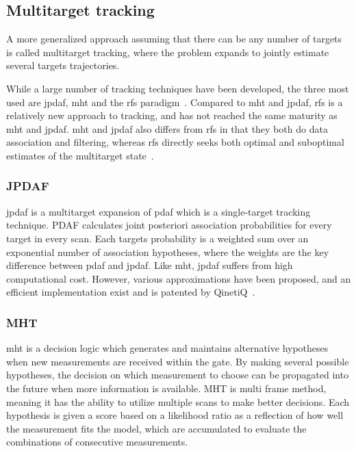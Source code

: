 \subsection{Multitarget tracking}
A more generalized approach assuming that there can be any number of targets is called multitarget tracking, where the problem expands to jointly estimate several targets trajectories.

While a large number of tracking techniques have been developed, the three most used are \gls{jpdaf}, \gls{mht} and the \gls{rfs} paradigm~\cite{Vo2015}. Compared to \gls{mht} and \gls{jpdaf}, \gls{rfs} is a relatively new approach to tracking, and has not reached the same maturity as \gls{mht} and \gls{jpdaf}. \gls{mht} and \gls{jpdaf} also differs from \gls{rfs} in that they both do data association and filtering, whereas \gls{rfs} directly seeks both optimal and suboptimal estimates of the multitarget state~\cite{Vo2015}.

\subsubsection{JPDAF}
\gls{jpdaf} is a multitarget expansion of \gls{pdaf} which is a single-target tracking technique. PDAF calculates joint posteriori association probabilities for every target in every scan. Each targets probability is a weighted sum over an exponential number of association hypotheses, where the weights are the key difference between \gls{pdaf} and \gls{jpdaf}. Like \gls{mht}, \gls{jpdaf} suffers from high computational cost. However, various approximations have been proposed, and an efficient implementation exist and is patented by QinetiQ~\cite{Horridge}.

\subsubsection{MHT}
\gls{mht} is a decision logic which generates and maintains alternative hypotheses when new \glspl{measurement} are received within the gate. By making several possible hypotheses, the decision on which \gls{measurement} to choose can be propagated into the future when more information is available. MHT is multi frame method, meaning it has the ability to utilize multiple scans to make better decisions. Each hypothesis is given a \gls{score} based on a likelihood ratio as a reflection of how well the measurement fits the model, which are accumulated to evaluate the combinations of consecutive \glspl{measurement}.


